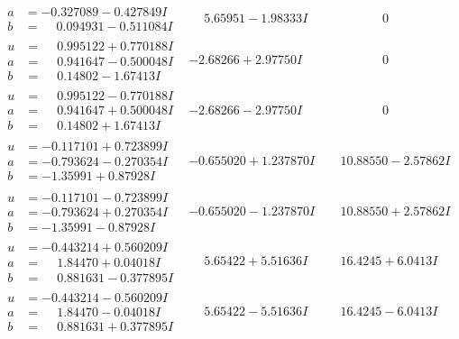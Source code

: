 \documentclass[1p]{elsarticle_modified}
\theoremstyle{definition}
\begin{document}
$$\begin{array}{c|c|c}
\begin{aligned}
a &= -0.327089 - 0.427849 I \\
b &= \phantom{-}0.094931 - 0.511084 I\end{aligned}
 & \phantom{-}5.65951 - 1.98333 I & \phantom{-0.000000 } 0 \\ \hline\begin{aligned}
u &= \phantom{-}0.995122 + 0.770188 I \\
a &= \phantom{-}0.941647 - 0.500048 I \\
b &= \phantom{-}0.14802 - 1.67413 I\end{aligned}
 & -2.68266 + 2.97750 I & \phantom{-0.000000 } 0 \\ \hline\begin{aligned}
u &= \phantom{-}0.995122 - 0.770188 I \\
a &= \phantom{-}0.941647 + 0.500048 I \\
b &= \phantom{-}0.14802 + 1.67413 I\end{aligned}
 & -2.68266 - 2.97750 I & \phantom{-0.000000 } 0 \\ \hline\begin{aligned}
u &= -0.117101 + 0.723899 I \\
a &= -0.793624 - 0.270354 I \\
b &= -1.35991 + 0.87928 I\end{aligned}
 & -0.655020 + 1.237870 I & \phantom{-}10.88550 - 2.57862 I \\ \hline\begin{aligned}
u &= -0.117101 - 0.723899 I \\
a &= -0.793624 + 0.270354 I \\
b &= -1.35991 - 0.87928 I\end{aligned}
 & -0.655020 - 1.237870 I & \phantom{-}10.88550 + 2.57862 I \\ \hline\begin{aligned}
u &= -0.443214 + 0.560209 I \\
a &= \phantom{-}1.84470 + 0.04018 I \\
b &= \phantom{-}0.881631 - 0.377895 I\end{aligned}
 & \phantom{-}5.65422 + 5.51636 I & \phantom{-}16.4245 + 6.0413 I \\ \hline\begin{aligned}
u &= -0.443214 - 0.560209 I \\
a &= \phantom{-}1.84470 - 0.04018 I \\
b &= \phantom{-}0.881631 + 0.377895 I\end{aligned}
 & \phantom{-}5.65422 - 5.51636 I & \phantom{-}16.4245 - 6.0413 I \\ \hline\begin{aligned}

\end{aligned}
\end{array}$$
\end{document}
